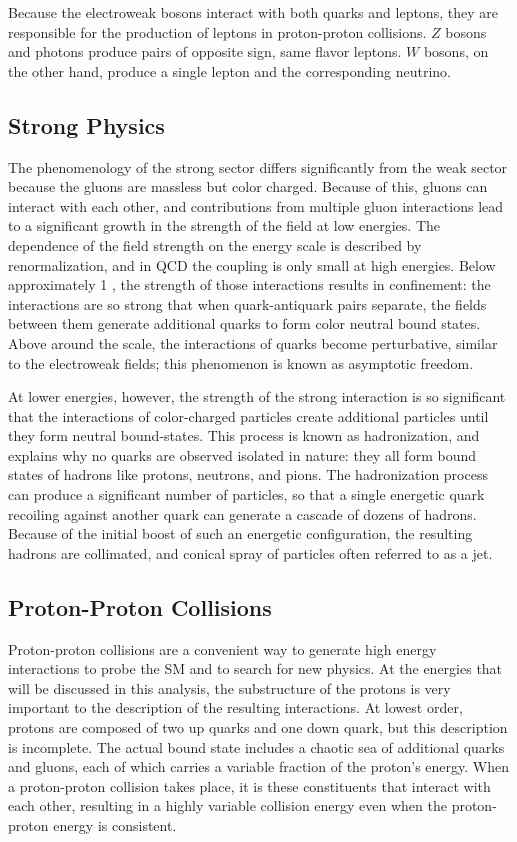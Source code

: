 Because the electroweak bosons interact with both quarks and leptons, they are responsible for the production of leptons in proton-proton collisions.
$Z$ bosons and photons produce pairs of opposite sign, same flavor leptons.
$W$ bosons, on the other hand, produce a single lepton and the corresponding neutrino.

\subsection{Strong Physics}
\label{sec:strong}

The phenomenology of the strong sector differs significantly from the weak sector because the gluons are massless but color charged.
Because of this, gluons can interact with each other, and contributions from multiple gluon interactions lead to a significant growth in the strength of the field at low energies.
The dependence of the field strength on the energy scale is described by renormalization, and in \ac{QCD} the coupling is only small at high energies.
Below approximately 1 \GeV, the strength of those interactions results in confinement: the interactions are so strong that when quark-antiquark pairs separate, the fields between them generate additional quarks to form color neutral bound states. 
Above around the \GeV scale, the interactions of quarks become perturbative, similar to the electroweak fields; this phenomenon is known as asymptotic freedom.

At lower energies, however, the strength of the strong interaction is so significant that the interactions of color-charged particles create additional particles until they form neutral bound-states.
This process is known as hadronization, and explains why no quarks are observed isolated in nature: they all form bound states of hadrons like protons, neutrons, and pions.
The hadronization process can produce a significant number of particles, so that a single energetic quark recoiling against another quark can generate a cascade of dozens of hadrons.
Because of the initial boost of such an energetic configuration, the resulting hadrons are collimated, and conical spray of particles often referred to as a jet.

\subsection{Proton-Proton Collisions}
\label{sec:ppcollisions}

Proton-proton collisions are a convenient way to generate high energy interactions to probe the \ac{SM} and to search for new physics.
At the energies that will be discussed in this analysis, the substructure of the protons is very important to the description of the resulting interactions.
At lowest order, protons are composed of two up quarks and one down quark, but this description is incomplete.
The actual bound state includes a chaotic sea of additional quarks and gluons, each of which carries a variable fraction of the proton's energy.
When a proton-proton collision takes place, it is these constituents that interact with each other, resulting in a highly variable collision energy even when the proton-proton energy is consistent.

